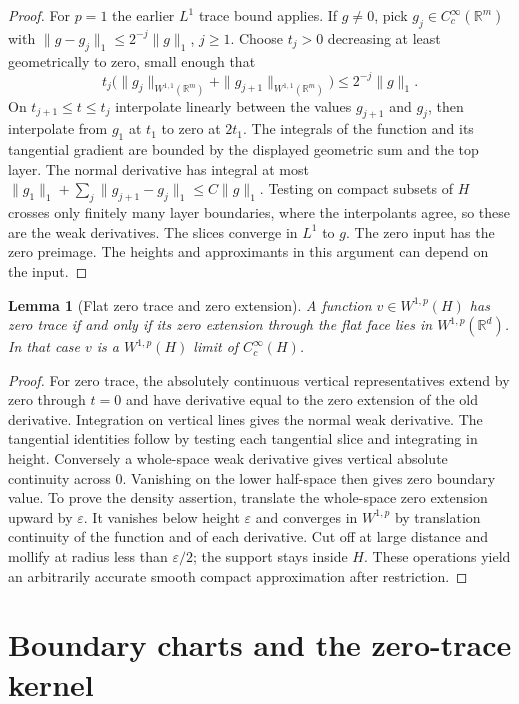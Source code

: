 \documentclass[11pt,oneside,openany]{book}
\newtheorem{lemma}[theorem]{Lemma}
\theoremstyle{definition}
\theoremstyle{remark}
\begin{document}
\begin{proof}
For \(p=1\) the earlier \(L^1\) trace bound applies. If \(g\ne0\),
pick \(g_j\in C_c^\infty(\mathbb R^m)\) with
\(\|g-g_j\|_1\le 2^{-j}\|g\|_1\), \(j\ge1\).
Choose \(t_j>0\) decreasing at least geometrically to zero, small
enough that
\[
 t_j\bigl(\|g_j\|_{W^{1,1}(\mathbb R^m)}
             +\|g_{j+1}\|_{W^{1,1}(\mathbb R^m)}\bigr)
 \le 2^{-j}\|g\|_1 .
\]
On \(t_{j+1}\le t\le t_j\) interpolate linearly between the values
\(g_{j+1}\) and \(g_j\), then interpolate from \(g_1\) at \(t_1\)
to zero at \(2t_1\). The integrals of the function and its
tangential gradient are bounded by the displayed geometric sum
and the top layer. The normal derivative has integral at most
\(\|g_1\|_1+\sum_j\|g_{j+1}-g_j\|_1\le C\|g\|_1\).
Testing on compact subsets of \(H\) crosses only finitely many
layer boundaries, where the interpolants agree, so these are the
weak derivatives. The slices converge in \(L^1\) to \(g\).
The zero input has the zero preimage. The heights and approximants
in this argument can depend on the input.
\end{proof}

\begin{lemma}[Flat zero trace and zero extension]\label{p102:u5-flat-zero}
A function \(v\in W^{1,p}(H)\) has zero trace if and only if its
zero extension through the flat face lies in \(W^{1,p}(\mathbb R^d)\).
In that case \(v\) is a \(W^{1,p}(H)\) limit of \(C_c^\infty(H)\).
\end{lemma}
\begin{proof}
For zero trace, the absolutely continuous vertical representatives
extend by zero through \(t=0\) and have derivative equal to the
zero extension of the old derivative. Integration on vertical lines
gives the normal weak derivative. The tangential identities follow
by testing each tangential slice and integrating in height. Conversely
a whole-space weak derivative gives vertical absolute continuity
across \(0\). Vanishing on the lower half-space then gives zero
boundary value. To prove the density assertion, translate the
whole-space zero extension upward by \(\varepsilon\). It vanishes
below height \(\varepsilon\) and converges in \(W^{1,p}\) by
translation continuity of the function and of each derivative.
Cut off at large distance and mollify at radius less than
\(\varepsilon/2\); the support stays inside \(H\).
These operations yield an arbitrarily accurate smooth compact
approximation after restriction.
\end{proof}

\section{Boundary charts and the zero-trace kernel}
\label{p102:U5-06}
\end{document}
